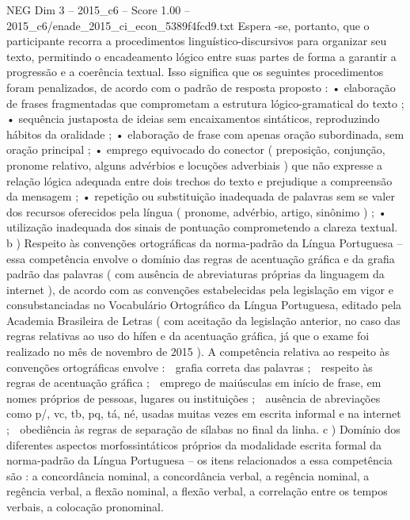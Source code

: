 \begin{textsample}{NEG Dim 3 – 2015\_c6 – Score 1.00 – 2015\_c6/enade\_2015\_ci\_econ\_5389f4fcd9.txt}
Espera -se, portanto, que o participante recorra a procedimentos linguístico-discursivos para organizar seu texto, permitindo o encadeamento lógico entre suas partes de forma a garantir a progressão e a coerência textual.
Isso significa que os seguintes procedimentos foram penalizados, de acordo com o padrão de resposta proposto : • elaboração de frases fragmentadas que comprometam a estrutura lógico-gramatical do texto ; • sequência justaposta de ideias sem encaixamentos sintáticos, reproduzindo hábitos da oralidade ; • elaboração de frase com apenas oração subordinada, sem oração principal ; • emprego equivocado do conector ( preposição, conjunção, pronome relativo, alguns advérbios e locuções adverbiais ) que não expresse a relação lógica adequada entre dois trechos do texto e prejudique a compreensão da mensagem ; • repetição ou substituição inadequada de palavras sem se valer dos recursos oferecidos pela língua ( pronome, advérbio, artigo, sinônimo ) ; • utilização inadequada dos sinais de pontuação comprometendo a clareza textual. b ) Respeito às convenções ortográficas da norma-padrão da Língua Portuguesa – essa competência envolve o domínio das regras de acentuação gráfica e da grafia padrão das palavras ( com ausência de abreviaturas próprias da linguagem da internet ), de acordo com as convenções estabelecidas pela legislação em vigor e consubstanciadas no Vocabulário Ortográfico da Língua Portuguesa, editado pela Academia Brasileira de Letras ( com aceitação da legislação anterior, no caso das regras relativas ao uso do hífen e da acentuação gráfica, já que o exame foi realizado no mês de novembro de 2015 ).
A competência relativa ao respeito às convenções ortográficas envolve :  grafia correta das palavras ;  respeito às regras de acentuação gráfica ;  emprego de maiúsculas em início de frase, em nomes próprios de pessoas, lugares ou instituições ;  ausência de abreviações como p/, vc, tb, pq, tá, né, usadas muitas vezes em escrita informal e na internet ;  obediência às regras de separação de sílabas no final da linha. c ) Domínio dos diferentes aspectos morfossintáticos próprios da modalidade escrita formal da norma-padrão da Língua Portuguesa – os itens relacionados a essa competência são : a concordância nominal, a concordância verbal, a regência nominal, a regência verbal, a flexão nominal, a flexão verbal, a correlação entre os tempos verbais, a colocação pronominal.

\end{textsample}
